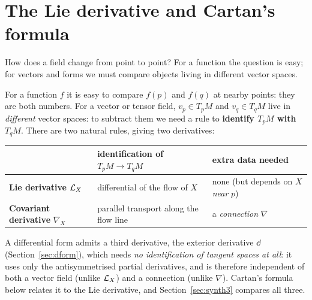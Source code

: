 \section{The Lie derivative and Cartan's formula}\label{sec:lie}

How does a field change from point to point? For a function the question is easy; for vectors and forms we must compare objects living in different
vector spaces.
\begin{intuition}
For a function $f$ it is easy to compare $f(p)$ and $f(q)$ at nearby points: they are both numbers. For a vector or tensor field, $v_p\in T_pM$ and $v_q\in T_qM$ live in \emph{different} vector spaces: to subtract them we need a rule to \textbf{identify $T_pM$ with $T_qM$}. There are two natural rules, giving two derivatives:
\begin{center}
\begin{tabular}{@{}p{3.6cm}p{5.6cm}p{5.2cm}@{}}
\toprule
 & identification of $T_pM\to T_{q}M$ & extra data needed\\ \midrule
\textbf{Lie derivative} $\mathcal{L}_X$ & differential of the flow of $X$ & none (but depends on $X$ \emph{near} $p$)\\
\textbf{Covariant derivative} $\nabla_X$ & parallel transport along the flow line & a \emph{connection} $\nabla$\\ \bottomrule
\end{tabular}
\end{center}
\end{intuition}


\begin{remark}
A differential form admits a third derivative, the exterior derivative $\dd$ (Section~\ref{sec:dform}), which needs \emph{no identification of tangent spaces at all}: it
uses only the antisymmetrised partial derivatives, and is therefore independent of both a vector field (unlike $\mathcal{L}_X$) and a connection (unlike $\nabla$).
Cartan's formula below relates it to the Lie derivative, and Section~\ref{sec:synth3} compares all three.
\end{remark}





